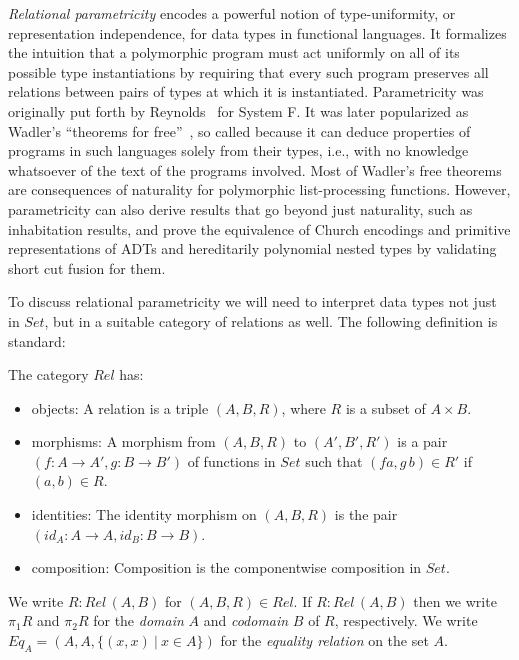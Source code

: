 \documentclass[acmsmall,screen,review,anonymous]{acmart}
\theoremstyle{definition}
\begin{document}
{\em Relational parametricity} encodes a powerful notion of
type-uniformity, or representation independence, for data types in
functional languages. It formalizes the intuition that a polymorphic
program must act uniformly on all of its possible type instantiations
by requiring that every such program preserves all relations between
pairs of types at which it is instantiated. Parametricity was
originally put forth by Reynolds~\cite{rey83} for System F. It was
later popularized as Wadler's ``theorems for free''~\cite{wad89}, so
called because it can deduce properties of programs in such languages
solely from their types, i.e., with no knowledge whatsoever of the
text of the programs involved.  Most of Wadler's free theorems are
consequences of naturality for polymorphic list-processing
functions. However, parametricity can also derive results that go
beyond just naturality, such as inhabitation results, and prove the
equivalence of Church encodings and primitive representations of ADTs
and hereditarily polynomial nested types by validating short cut
fusion for them.

To discuss relational parametricity we will need to interpret data
types not just in $\mathit{Set}$, but in a suitable category of
relations as well. The following definition is standard:
\begin{definition}
  The category $\mathit{Rel}$ has:
  \begin{itemize}
\item objects: A relation is a triple $(A,B,R)$, where $R$ is a
  subset of $A \times B$.
\item morphisms: A morphism from $(A,B,R)$ to $(A',B',R')$ is a pair
  $(f : A \to A',g : B \to B')$ of functions in $\mathit{Set}$ such
  that $(f a,g\,b) \in R'$ if $(a,b) \in R$.
\item identities: The identity morphism on $(A,B,R)$ is the pair
  $(\mathit{id}_A : A \to A, \mathit{id}_B : B \to B)$.
\item composition: Composition is the componentwise composition in
  $\mathit{Set}$. 
\end{itemize}
\end{definition}
\noindent
We write $R : \mathit{Rel}\,(A,B)$ for $(A,B,R) \in \mathit{Rel}$.  If
$R : \mathit{Rel}\,(A,B)$ then we write $\pi_1 R$ and $\pi_2 R$ for
the {\em domain} $A$ and {\em codomain} $B$ of $R$, respectively. We
write $\mathit{Eq}_A = (A,A,\{(x,x)~|~ x \in A\})$ for the {\em
  equality relation} on the set $A$.
\end{document}

